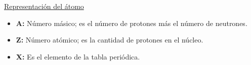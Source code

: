             \begin{center}
                \underline{Representación del átomo} \\[5pt]
            \end{center}

                \begin{itemize}
                    \item \textbf{A:} Número másico; es el número de protones más el número de neutrones.
                    \item \textbf{Z:} Número atómico; es la cantidad de protones en el núcleo.
                    \item \textbf{X:} Es el elemento de la tabla periódica.
                \end{itemize}


